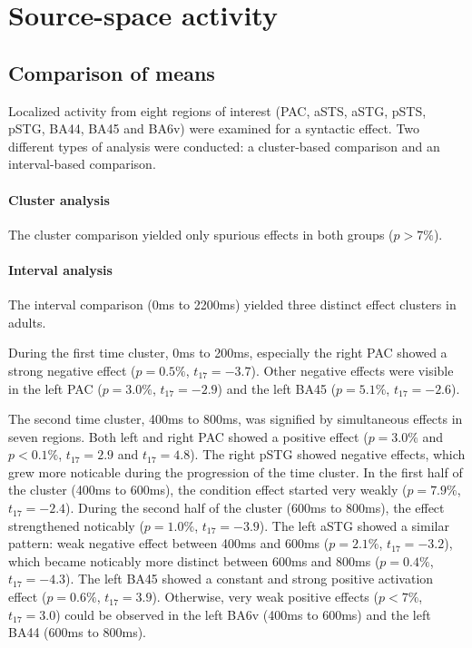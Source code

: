 \section{Source-space activity}\label{4.3}

\subsection{Comparison of means}
Localized activity from eight regions of interest (PAC, aSTS, aSTG, pSTS, pSTG, BA44, BA45 and BA6v) were examined for a syntactic effect.
Two different types of analysis were conducted: a cluster-based comparison and an interval-based comparison.

\paragraph{Cluster analysis}
The cluster comparison yielded only spurious effects in both groups ($p > 7\%$).

\paragraph{Interval analysis}
The interval comparison (0ms to 2200ms) yielded three distinct effect clusters in adults.

During the first time cluster, 0ms to 200ms, especially the right PAC showed a strong negative effect ($p = 0.5\%$, $t_{17} = -3.7$).
Other negative effects were visible in the left PAC ($p = 3.0\%$, $t_{17} = -2.9$) and the left BA45 ($p = 5.1\%$, $t_{17} = -2.6$).

The second time cluster, 400ms to 800ms, was signified by simultaneous effects in seven regions.
Both left and right PAC showed a positive effect ($p = 3.0\%$ and $p < 0.1\%$, $t_{17} = 2.9$ and $t_{17} = 4.8$).
The right pSTG showed negative effects, which grew more noticable during the progression of the time cluster.
In the first half of the cluster (400ms to 600ms), the condition effect started very weakly ($p = 7.9\%$, $t_{17} = -2.4$).
During the second half of the cluster (600ms to 800ms), the effect strengthened noticably ($p = 1.0\%$, $t_{17} = -3.9$).
The left aSTG showed a similar pattern: weak negative effect between 400ms and 600ms ($p = 2.1\%$, $t_{17} = -3.2$), which became noticably more distinct between 600ms and 800ms ($p = 0.4\%$, $t_{17} = -4.3$).
The left BA45 showed a constant and strong positive activation effect ($p = 0.6\%$, $t_{17} = 3.9$).
Otherwise, very weak positive effects ($p < 7\%$, $t_{17} = 3.0$) could be observed in the left BA6v (400ms to 600ms) and the left BA44 (600ms to 800ms).

